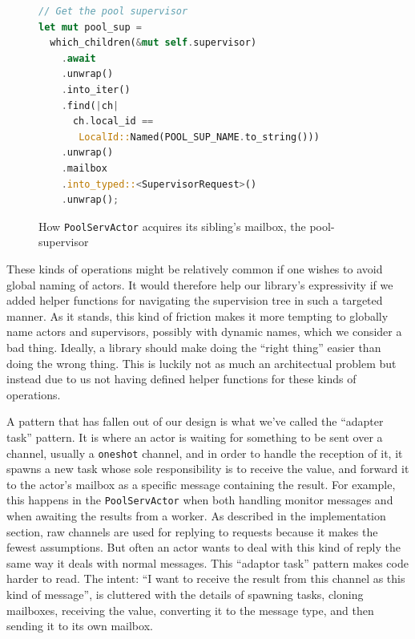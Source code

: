 \documentclass[a4paper]{article}
\begin{document}
\begin{itemize}
  \begin{figure}[h]
    \centering
    \begin{minipage}[h]{0.4\linewidth}
\begin{lstlisting}[language=Rust,basicstyle=\footnotesize]
// Get the pool supervisor
let mut pool_sup =
  which_children(&mut self.supervisor)
    .await
    .unwrap()
    .into_iter()
    .find(|ch|
      ch.local_id ==
       LocalId::Named(POOL_SUP_NAME.to_string()))
    .unwrap()
    .mailbox
    .into_typed::<SupervisorRequest>()
    .unwrap();
\end{lstlisting}
    \end{minipage}
    \caption{How \texttt{PoolServActor} acquires its sibling's mailbox, the pool-supervisor}
    \label{fig:sibling}
  \end{figure}
These kinds of operations might be relatively common if one wishes to avoid
global naming of actors. It would therefore help our library's expressivity if
we added helper functions for navigating the supervision tree in such a targeted
manner. As it stands, this kind of friction makes it more tempting to globally name
actors and supervisors, possibly with dynamic names, which we consider a bad
thing. Ideally, a library should make doing the ``right thing'' easier than doing
the wrong thing. This is luckily not as much an architectual problem but instead
due to us not having defined helper functions for these kinds of operations.
\end{itemize}

\noindent
A pattern that has fallen out of our design is what we've
called the ``adapter task'' pattern. It is where an actor is waiting for something to
be sent over a channel, usually a \texttt{oneshot} channel, and in order to
handle the reception of it, it spawns a new task whose sole responsibility is to
receive the value, and forward it to the actor's mailbox as a specific message
containing the result. For example, this happens in the \texttt{PoolServActor} when
both handling monitor messages and when awaiting the results from a worker. As
described in the implementation section, raw channels are used for replying to
requests because it makes the fewest assumptions. But often an actor wants to
deal with this kind of reply the same way it deals with normal messages. This
``adaptor task'' pattern makes code harder to read. The intent: ``I want to receive the result from this channel as this kind of
message'', is cluttered with the details of spawning tasks, cloning mailboxes, receiving the
value, converting it to the message type, and then sending it to its own mailbox.\\
\end{document}
